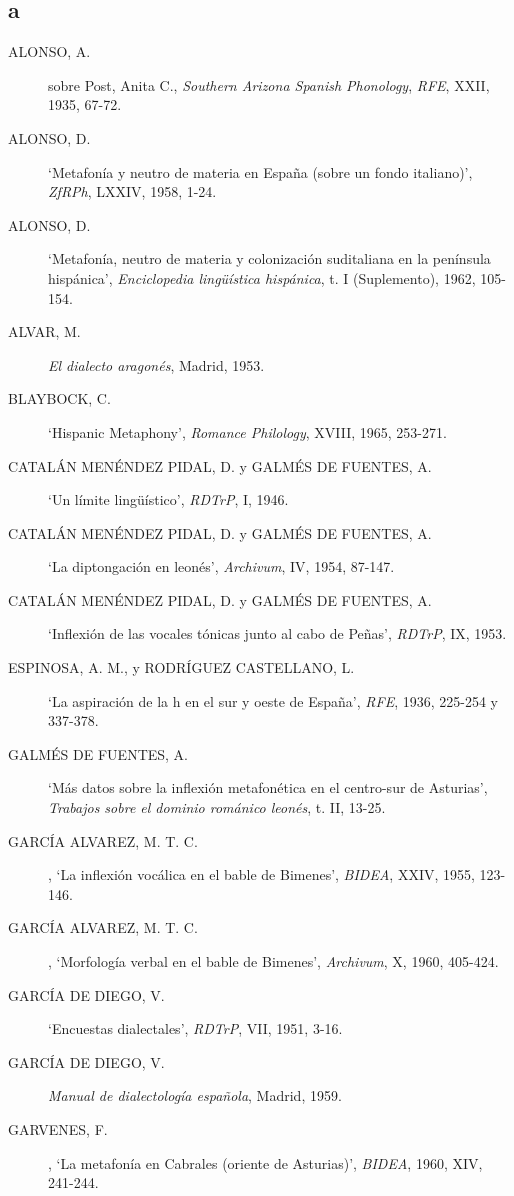 \subsection{a} \begin{description}
\item[ALONSO, A.] sobre Post, Anita C., \textit{Southern Arizona Spanish Phonology}, \textit{RFE}, XXII, 1935, 67-72.
\item[ALONSO, D.] `Metafonía y neutro de materia en España (sobre un fondo italiano)', \textit{ZfRPh}, LXXIV, 1958, 1-24.
\item[ALONSO, D.]`Metafonía, neutro de materia y colonización suditaliana en la península hispánica', \textit{Enciclopedia lingüística hispánica}, t. I (Suplemento), 1962, 105-154.
\item[ALVAR, M.] \textit{El dialecto aragonés}, Madrid, 1953. 
\item[BLAYBOCK, C.] `Hispanic Metaphony',  \textit{Romance Philology}, XVIII, 1965, 253-271.
\item[CATALÁN MENÉNDEZ PIDAL, D. y GALMÉS DE FUENTES, A.] `Un límite lingüístico', \textit{RDTrP}, I, 1946. 
\item[CATALÁN MENÉNDEZ PIDAL, D. y GALMÉS DE FUENTES, A.] `La diptongación en leonés', \textit{Archivum}, IV, 1954, 87-147.
\item[CATALÁN MENÉNDEZ PIDAL, D. y GALMÉS DE FUENTES, A.] `Inflexión de las vocales tónicas junto al cabo de Peñas', \textit{RDTrP}, IX, 1953.
\item[ESPINOSA, A. M., y RODRÍGUEZ CASTELLANO, L.] `La aspiración de la h en el sur y oeste de España', \textit{RFE}, 1936, 225-254 y 337-378. 
\item[GALMÉS DE FUENTES, A.] `Más datos sobre la inflexión metafonética en el centro-sur de Asturias', \textit{Trabajos sobre el dominio románico leonés}, t. II, 13-25.
\item[GARCÍA ALVAREZ, M. T. C.], `La inflexión vocálica en el bable de Bimenes', \textit{BIDEA}, XXIV, 1955, 123-146.
\item[GARCÍA ALVAREZ, M. T. C.], `Morfología verbal en el bable de Bimenes', \textit{Archivum}, X, 1960, 405-424.
\item[GARCÍA DE DIEGO, V.] `Encuestas dialectales', \textit{RDTrP}, VII, 1951, 3-16. 
\item[GARCÍA DE DIEGO, V.] \textit{Manual de dialectología española}, Madrid, 1959.
\item[GARVENES, F.], `La metafonía en Cabrales (oriente de Asturias)', \textit{BIDEA}, 1960, XIV, 241-244.

\end{description}
